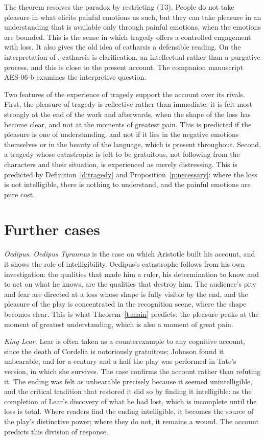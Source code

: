 \documentclass{situationist-preprint}
\begin{document}
The theorem resolves the paradox by restricting (T3). People do not take pleasure in what elicits painful emotions as such, but they can take pleasure in an understanding that is available only through painful emotions, when the emotions are bounded. This is the sense in which tragedy offers a controlled engagement with loss. It also gives the old idea of catharsis a defensible reading. On the interpretation of \citet{Golden1962}, catharsis is clarification, an intellectual rather than a purgative process, and this is close to the present account. The companion manuscript AES-06-b examines the interpretive question.

Two features of the experience of tragedy support the account over its rivals. First, the pleasure of tragedy is reflective rather than immediate: it is felt most strongly at the end of the work and afterwards, when the shape of the loss has become clear, and not at the moments of greatest pain. This is predicted if the pleasure is one of understanding, and not if it lies in the negative emotions themselves or in the beauty of the language, which is present throughout. Second, a tragedy whose catastrophe is felt to be gratuitous, not following from the characters and their situation, is experienced as merely distressing. This is predicted by Definition~\ref{d:tragedy} and Proposition~\ref{p:necessary}: where the loss is not intelligible, there is nothing to understand, and the painful emotions are pure cost.

\section{Further cases}

\emph{Oedipus.} \emph{Oedipus Tyrannus} is the case on which Aristotle built his account, and it shows the role of intelligibility. Oedipus's catastrophe follows from his own investigation: the qualities that made him a ruler, his determination to know and to act on what he knows, are the qualities that destroy him. The audience's pity and fear are directed at a loss whose shape is fully visible by the end, and the pleasure of the play is concentrated in the recognition scene, where the shape becomes clear. This is what Theorem~\ref{t:main} predicts: the pleasure peaks at the moment of greatest understanding, which is also a moment of great pain.

\emph{King Lear.} Lear is often taken as a counterexample to any cognitive account, since the death of Cordelia is notoriously gratuitous; Johnson found it unbearable, and for a century and a half the play was performed in Tate's version, in which she survives. The case confirms the account rather than refuting it. The ending was felt as unbearable precisely because it seemed unintelligible, and the critical tradition that restored it did so by finding it intelligible: as the completion of Lear's discovery of what he had lost, which is incomplete until the loss is total. Where readers find the ending intelligible, it becomes the source of the play's distinctive power; where they do not, it remains a wound. The account predicts this division of response.
\end{document}

